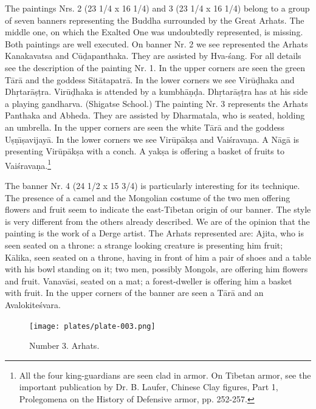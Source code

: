 \documentclass[a4paper, 12pt, oneside]{article}
\begin{document}
The paintings Nrs. 2 (23 1/4 x 16 1/4) and 3 (23 1/4 x 16 1/4) belong to a group of seven banners representing the Buddha surrounded by the Great Arhats. The middle one, on which the Exalted One was undoubtedly represented, is missing. Both paintings are well executed. On banner Nr. 2 we see represented the Arhats Kanakavatsa and C\={u}\d{d}apanthaka. They are assisted by Hva-\'{s}ang. For all details see the description of the painting Nr. 1. In the upper corners are seen the green T\={a}r\={a} and the goddess Sit\={a}tapatr\={a}. In the lower corners we see Vir\={u}\d{d}haka and Dh\d{r}tar\={a}\d{s}\d{t}ra. Vir\={u}\d{d}haka is attended by a kumbh\={a}\d{n}\d{d}a. Dh\d{r}tar\={a}\d{s}\d{t}ra has at his side a playing gandharva. (Shigatse School.) The painting Nr. 3 represents the Arhats Panthaka and Abheda. They are assisted by Dharmatala, who is seated, holding an umbrella. In the upper corners are seen the white T\={a}r\={a} and the goddess U\d{s}\d{n}\={\i}\d{s}avijay\={a}. In the lower corners we see Vir\={u}p\={a}k\d{s}a and Vai\'{s}rava\d{n}a. A N\={a}g\={a} is presenting Vir\={u}p\={a}k\d{s}a with a conch. A yak\d{s}a is offering a basket of fruits to Vai\'{s}rava\d{n}a.\footnote{All the four king-guardians are seen clad in armor. On Tibetan armor, see the important publication by Dr. B. Laufer, Chinese Clay figures, Part 1, Prolegomena on the History of Defensive armor, pp. 252-257.}

The banner Nr. 4 (24 1/2 x 15 3/4) is particularly interesting for its technique. The presence of a camel and the Mongolian costume of the two men offering flowers and fruit seem to indicate the east-Tibetan origin of our banner. The style is very different from the others already described. We are of the opinion that the painting is the work of a Derge artist. The Arhats represented are: Ajita, who is seen seated on a throne: a strange looking creature is presenting him fruit; K\={a}lika, seen seated on a throne, having in front of him a pair of shoes and a table with his bowl standing on it; two men, possibly Mongols, are offering him flowers and fruit. Vanav\={a}si, seated on a mat; a forest-dweller is offering him a basket with fruit. In the upper corners of the banner are seen a T\={a}r\={a} and an Avalokite\'{s}vara.

\clearpage
\vspace*{\fill}
\begin{figure}[H]
\centering
\texttt{[image: plates/plate-003.png]}
\caption*{Number 3. Arhats.}
\end{figure}
\vspace*{\fill}
\clearpage
\end{document}

